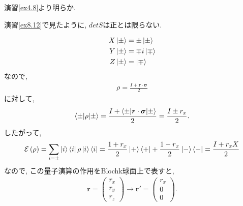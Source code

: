 \begin{ex}
    \label{ex8.13}
    演習\ref{ex4.8}より明らか.
\end{ex}

\begin{ex}
    \label{ex8.14}
    演習\ref{ex8.12}で見たように, $det S$は正とは限らない.
\end{ex}

\begin{ex}
    \label{ex8.15}
    \begin{align*}
        X \ket{\pm} & = \pm \ket{\pm}  \\
        Y \ket{\pm} & = \mp i\ket{\mp} \\
        Z \ket{\pm} & = \ket{\mp}
    \end{align*}
    なので,
    \begin{align*}
        \rho = \frac{I + \bm{r} \cdot \bm{\sigma}}{2}
    \end{align*}
    に対して,
    \begin{align*}
        \braket{\pm | \rho | \pm}
        =
        \frac{I + \braket{ \pm| \bm{r} \cdot \bm{\sigma} |\pm}}{2}
        =
        \frac{I \pm r_x}{2}.
    \end{align*}
    したがって,
    \begin{align*}
        \mathcal{E}\left( \rho \right)
        =
        \sum_{i = \pm} \ket{i}\bra{i} \rho \ket{i}\bra{i}
        =
        \frac{1 + r_x}{2} \ket{+}\bra{+} + \frac{1 - r_x}{2} \ket{-}\bra{-}
        =
        \frac{I + r_x X}{2}
    \end{align*}
    なので, この量子演算の作用をBlochk球面上で表すと,
    \begin{align*}
        \bm{r} =
        \begin{pmatrix}
            r_x \\
            r_y \\
            r_z
        \end{pmatrix}
        \longrightarrow
        \bm{r}' =
        \begin{pmatrix}
            r_x \\
            0   \\
            0 
        \end{pmatrix}.
    \end{align*}
\end{ex}


